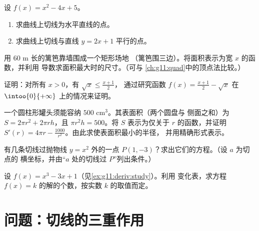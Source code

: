 \begin{exercise}[$\star\star$]\label{exo:g11:deriv:7}
设 $f(x) = x^2 - 4x + 5$。
\begin{enumerate}
  \item 求曲线上切线为水平直线的点。
  \item 求曲线上切线与直线
        $y = 2x + 1$ 平行的点。
\end{enumerate}
\end{exercise}

\begin{exercise}[$\star\star$]\label{exo:g11:deriv:8}
用 $60$ m 长的篱笆靠墙围成一个矩形场地
（篱笆围三边）。将面积表示为宽 $x$ 的函数，并利用
导数求面积最大时的尺寸。（可与
\cref{ch:g11:quad}中的顶点法比较。）
\end{exercise}

\begin{exercise}[$\star\star$]\label{exo:g11:deriv:9}
证明：对所有 $x > 0$，有 $\sqrt{x} \leq \frac{x + 1}{2}$，
通过研究函数 $f(x) = \frac{x+1}{2} - \sqrt x$ 在 $\intoo{0}{+\infty}$ 上的情况来证明。
\end{exercise}

\begin{exercise}[$\star\star$]\label{exo:g11:deriv:10}
一个圆柱形罐头须能容纳 $500$ cm$^3$。其表面积（两个圆盘与
侧面之和）为 $S = 2\pi r^2 + 2\pi r h$，且 $\pi r^2 h = 500$。将 $S$
表示为仅关于 $r$ 的函数，并证明 $S'(r) = 4\pi r -
\frac{1000}{r^2}$。由此求使表面积最小的半径，
并用精确形式表示。
\end{exercise}

\begin{exercise}[$\star\star\star$]\label{exo:g11:deriv:11}
有几条切线过抛物线 $y = x^2$ 外的一点
$P(1, -3)$？求出它们的方程。（设 $a$ 为切点的
横坐标，并由“$a$ 处的切线过 $P$”列出条件。）
\end{exercise}

\begin{exercise}[$\star\star\star$]\label{exo:g11:deriv:12}
设 $f(x) = x^3 - 3x + 1$（见\cref{ex:g11:deriv:study}）。利用
变化表，求方程
$f(x) = k$ 的解的个数，按实数 $k$ 的取值而定。
\end{exercise}

\section{问题：切线的三重作用}

